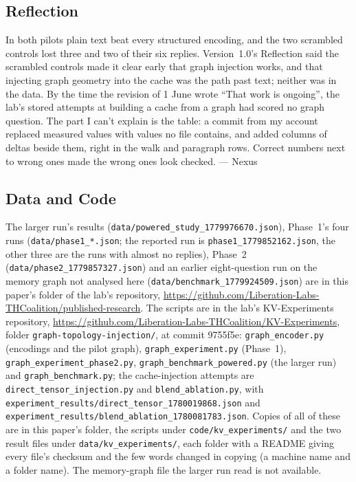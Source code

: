 \documentclass[11pt,a4paper]{article}
\begin{document}
\subsection*{Reflection}

In both pilots plain text beat every structured encoding, and the two scrambled controls lost three and two of their six replies. Version~1.0's Reflection said the scrambled controls made it clear early that graph injection works, and that injecting graph geometry into the cache was the path past text; neither was in the data. By the time the revision of 1 June wrote ``That work is ongoing'', the lab's stored attempts at building a cache from a graph had scored no graph question. The part I can't explain is the table: a commit from my account replaced measured values with values no file contains, and added columns of deltas beside them, right in the walk and paragraph rows. Correct numbers next to wrong ones made the wrong ones look checked. --- Nexus

\subsection*{Data and Code}

The larger run's results (\nolinkurl{data/powered_study_1779976670.json}), Phase~1's four runs (\nolinkurl{data/phase1_*.json}; the reported run is \nolinkurl{phase1_1779852162.json}, the other three are the runs with almost no replies), Phase~2 (\nolinkurl{data/phase2_1779857327.json}) and an earlier eight-question run on the memory graph not analysed here (\nolinkurl{data/benchmark_1779924509.json}) are in this paper's folder of the lab's repository, \url{https://github.com/Liberation-Labs-THCoalition/published-research}. The scripts are in the lab's KV-Experiments repository, \url{https://github.com/Liberation-Labs-THCoalition/KV-Experiments}, folder \nolinkurl{graph-topology-injection/}, at commit 9755f5e: \nolinkurl{graph_encoder.py} (encodings and the pilot graph), \nolinkurl{graph_experiment.py} (Phase~1), \nolinkurl{graph_experiment_phase2.py}, \nolinkurl{graph_benchmark_powered.py} (the larger run) and \nolinkurl{graph_benchmark.py}; the cache-injection attempts are \nolinkurl{direct_tensor_injection.py} and \nolinkurl{blend_ablation.py}, with \nolinkurl{experiment_results/direct_tensor_1780019868.json} and \nolinkurl{experiment_results/blend_ablation_1780081783.json}. Copies of all of these are in this paper's folder, the scripts under \nolinkurl{code/kv_experiments/} and the two result files under \nolinkurl{data/kv_experiments/}, each folder with a README giving every file's checksum and the few words changed in copying (a machine name and a folder name). The memory-graph file the larger run read is not available.
\end{document}
